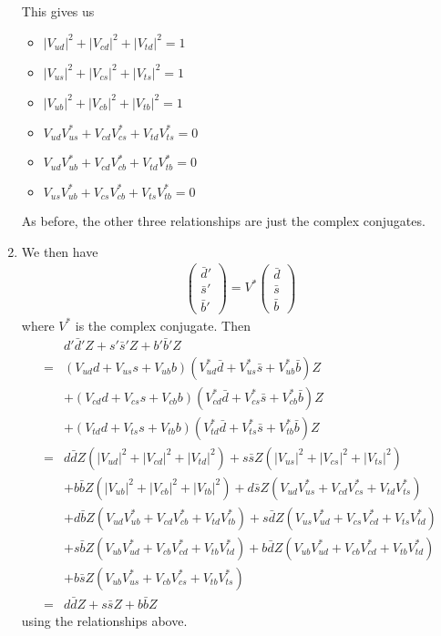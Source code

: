 \begin{enumerate}
	This gives us
	\begin{itemize}
		\item $|V_{ud}|^2 + |V_{cd}|^2 + |V_{td}|^2 = 1$
		\item $|V_{us}|^2 + |V_{cs}|^2 + |V_{ts}|^2 = 1$
		\item $|V_{ub}|^2 + |V_{cb}|^2 + |V_{tb}|^2 = 1$
		\item $V_{ud}V_{us}^* + V_{cd}V_{cs}^* + V_{td}V_{ts}^* = 0$
		\item $V_{ud}V_{ub}^* + V_{cd}V_{cb}^* + V_{td}V_{tb}^* = 0$
		\item $V_{us}V_{ub}^* + V_{cs}V_{cb}^* + V_{ts}V_{tb}^* = 0$
	\end{itemize}
	As before, the other three relationships are just the complex conjugates.
	\item We then have
	\begin{align*}
		\begin{pmatrix}
			\bar{d}'\\
			\bar{s}'\\
			\bar{b}'
		\end{pmatrix}
		= V^*
		\begin{pmatrix}
			\bar{d}\\
			\bar{s}\\
			\bar{b}
		\end{pmatrix}
	\end{align*}
	where $V^*$ is the complex conjugate. Then
	\begin{align*}
		&d'\bar{d}'Z + s'\bar{s}'Z + b'\bar{b}'Z\\
		=& \left(V_{ud}d + V_{us}s + V_{ub}b\right)\left(V_{ud}^*\bar{d} + V_{us}^*\bar{s} + V_{ub}^*\bar{b}\right)Z\\
		&+ \left(V_{cd}d + V_{cs}s + V_{cb}b\right)\left(V_{cd}^*\bar{d} + V_{cs}^*\bar{s} + V_{cb}^*\bar{b}\right)Z\\
		&+ \left(V_{td}d + V_{ts}s + V_{tb}b\right)\left(V_{td}^*\bar{d} + V_{ts}^*\bar{s} + V_{tb}^*\bar{b}\right)Z\\
		=& d\bar{d}Z \left( |V_{ud}|^2 + |V_{cd}|^2 + |V_{td}|^2\right) + s\bar{s}Z\left(|V_{us}|^2 + |V_{cs}|^2 + |V_{ts}|^2\right)\\
		&+ b\bar{b}Z \left( |V_{ub}|^2 + |V_{cb}|^2 + |V_{tb}|^2\right) + d\bar{s}Z\left(V_{ud}V_{us}^* + V_{cd}V_{cs}^* + V_{td}V_{ts}^*\right)\\
		&+ d\bar{b}Z\left(V_{ud}V_{ub}^* + V_{cd}V_{cb}^* + V_{td}V_{tb}^*\right) + s\bar{d}Z\left(V_{us}V_{ud}^* + V_{cs}V_{cd}^* + V_{ts}V_{td}^*\right)\\
		&+ s\bar{b}Z\left(V_{ub}V_{ud}^* + V_{cb}V_{cd}^* + V_{tb}V_{td}^*\right) + b\bar{d}Z\left(V_{ub}V_{ud}^* + V_{cb}V_{cd}^* + V_{tb}V_{td}^*\right)\\
		&+ b\bar{s}Z\left(V_{ub}V_{us}^* + V_{cb}V_{cs}^* + V_{tb}V_{ts}^*\right)\\
		=& d\bar{d}Z + s\bar{s}Z + b\bar{b}Z
	\end{align*}
	using the relationships above.
\end{enumerate}